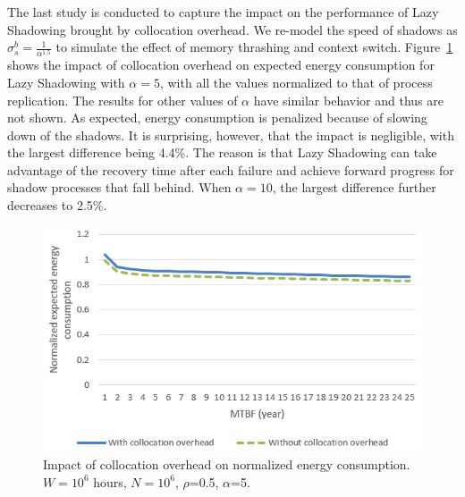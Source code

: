 The last study is conducted to capture the impact on the 
performance of Lazy Shadowing brought by 
collocation overhead. We re-model the speed of shadows as $\sigma_s^b=\frac{1}{\alpha^{1.5}}$ to simulate the 
effect of memory thrashing and context switch. 
Figure~\ref{fig:comp_vary_fail_speed} shows the impact of collocation overhead on expected energy consumption for Lazy Shadowing with $\alpha=5$, with all the values normalized to that of process replication. The results for other values of $\alpha$ have similar behavior and thus are not shown. As expected, energy consumption is penalized because
of slowing down of the shadows. It is surprising, however, that the impact is negligible, with the largest difference being 4.4\%. The reason is that Lazy Shadowing can take advantage of the recovery time after each failure and achieve forward progress for shadow processes that fall behind. When $\alpha=10$, the largest difference further decreases to 2.5\%. 


\begin{figure}[t]
	\begin{center}
		\includegraphics[width=0.5\columnwidth]{Figures/collocation}
	\end{center}
	\caption{Impact of collocation overhead on normalized energy consumption. $W=10^6$ hours, $N=10^6$, $\rho$=0.5, $\alpha$=5.}
	\label{fig:comp_vary_fail_speed}
\end{figure}
